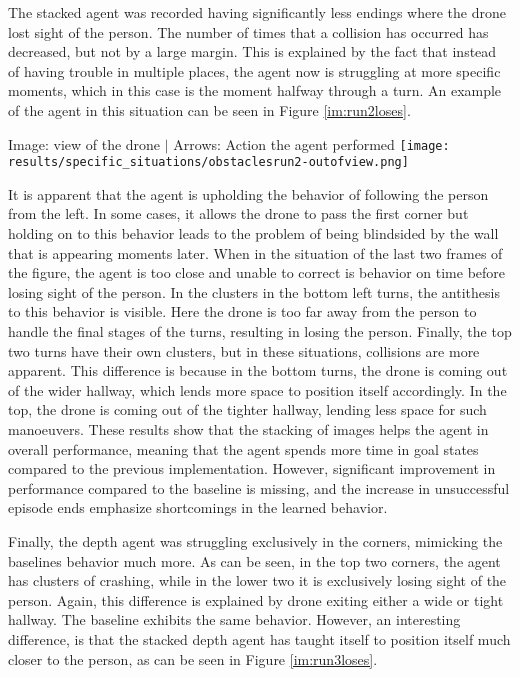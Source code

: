The stacked agent was recorded having significantly less 
endings where the drone lost sight of the person. The number of times 
that a collision has occurred has decreased, but not by a large margin. This 
is explained by the fact that instead of having trouble in multiple places, the 
agent now is struggling at more specific moments, which in this case is the moment 
halfway through a turn. An example of the agent in this 
situation can be seen in Figure \ref{im:run2loses}. 

\begin{Figure}
    \centering
    \small
    Image: view of the drone $|$ Arrows: Action the agent performed
    \texttt{[image: results/specific\_situations/obstaclesrun2-outofview.png]}
    \label{im:run2loses}
\end{Figure}

It is apparent that the agent is upholding the behavior of following the person from the 
left. In some cases, it allows the drone to pass the first corner but holding on 
to this behavior leads to the problem of being blindsided 
by the wall that is appearing moments later. When in the situation of the last two 
frames of the figure, the agent is too close and unable to correct is behavior on time before 
losing sight of the person. In the clusters in the bottom left turns, the antithesis to this 
behavior is visible. Here the drone is too far away from the person to handle the final stages 
of the turns, resulting in losing the person. Finally, the top two turns have their own 
clusters, but in these situations, collisions are more apparent. This difference is 
because in the bottom turns, the drone is coming out of the 
wider hallway, which lends more space to position itself accordingly. In the top, 
the drone is coming out of the tighter hallway, lending less space for such manoeuvers. 
These results show that the stacking of images helps the agent in overall performance, meaning 
that the agent spends more time in goal states compared to the previous implementation. However, 
significant improvement in performance compared to the baseline is missing, and the increase in 
unsuccessful episode ends emphasize shortcomings in the learned behavior. 

Finally, the depth agent was struggling exclusively in the 
corners, mimicking the baselines behavior much more. As can be seen, in the top 
two corners, the agent has clusters of crashing, while in the lower two it is exclusively 
losing sight of the person. Again, this difference is explained by drone exiting either a 
wide or tight hallway. The baseline exhibits the same behavior. However, an interesting 
difference, is that the stacked depth agent has taught itself to position itself much 
closer to the person, as can be seen in Figure \ref{im:run3loses}. 

